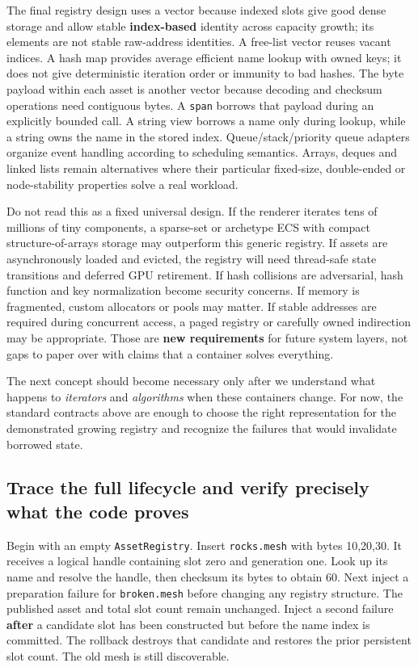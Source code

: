The final registry design uses a vector because indexed slots give good dense storage and allow stable \textbf{index-based} identity across capacity growth; its elements are not stable raw-address identities. A free-list vector reuses vacant indices. A hash map provides average efficient name lookup with owned keys; it does not give deterministic iteration order or immunity to bad hashes. The byte payload within each asset is another vector because decoding and checksum operations need contiguous bytes. A \texttt{span} borrows that payload during an explicitly bounded call. A string view borrows a name only during lookup, while a string owns the name in the stored index. Queue/stack/priority queue adapters organize event handling according to scheduling semantics. Arrays, deques and linked lists remain alternatives where their particular fixed-size, double-ended or node-stability properties solve a real workload.

Do not read this as a fixed universal design. If the renderer iterates tens of millions of tiny components, a sparse-set or archetype ECS with compact structure-of-arrays storage may outperform this generic registry. If assets are asynchronously loaded and evicted, the registry will need thread-safe state transitions and deferred GPU retirement. If hash collisions are adversarial, hash function and key normalization become security concerns. If memory is fragmented, custom allocators or pools may matter. If stable addresses are required during concurrent access, a paged registry or carefully owned indirection may be appropriate. Those are \textbf{new requirements} for future system layers, not gaps to paper over with claims that a container solves everything.

The next concept should become necessary only after we understand what happens to \emph{iterators} and \emph{algorithms} when these containers change. For now, the standard contracts above are enough to choose the right representation for the demonstrated growing registry and recognize the failures that would invalidate borrowed state.

\subsection{Trace the full lifecycle and verify precisely what the code proves}\label{05-engine-i-ch005-trace-the-full-lifecycle-and-verify-precisely-what-the-code-proves}

Begin with an empty \texttt{AssetRegistry}. Insert \texttt{rocks.mesh} with bytes 10,20,30. It receives a logical handle containing slot zero and generation one. Look up its name and resolve the handle, then checksum its bytes to obtain 60. Next inject a preparation failure for \texttt{broken.mesh} before changing any registry structure. The published asset and total slot count remain unchanged. Inject a second failure \textbf{after} a candidate slot has been constructed but before the name index is committed. The rollback destroys that candidate and restores the prior persistent slot count. The old mesh is still discoverable.

